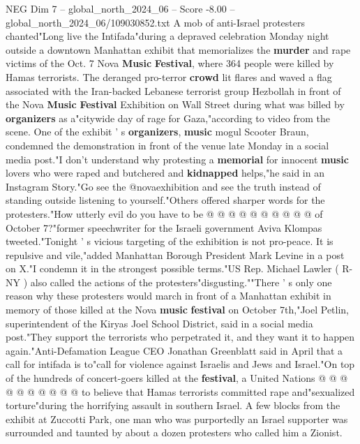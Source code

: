 \begin{textsample}{NEG Dim 7 – global\_north\_2024\_06 – Score -8.00 – global\_north\_2024\_06/109030852.txt}  \label{ex:f7_neg_139}
A mob of anti-Israel protesters chanted"Long live the Intifada"during a depraved celebration Monday night outside a downtown Manhattan exhibit that memorializes the \textbf{murder} and rape victims of the Oct. 7 Nova \textbf{Music} \textbf{Festival}, where 364 people were killed by Hamas terrorists.
The deranged pro-terror \textbf{crowd} lit flares and waved a flag associated with the Iran-backed Lebanese terrorist group Hezbollah in front of the Nova \textbf{Music} \textbf{Festival} Exhibition on Wall Street during what was billed by \textbf{organizers} as a"citywide day of rage for Gaza,"according to video from the scene.
One of the exhibit ' s \textbf{organizers}, \textbf{music} mogul Scooter Braun, condemned the demonstration in front of the venue late Monday in a social media post."I don't understand why protesting a \textbf{memorial} for innocent \textbf{music} lovers who were raped and butchered and \textbf{kidnapped} helps,"he said in an Instagram Story."Go see the @novaexhibition and see the truth instead of standing outside listening to yourself."Others offered sharper words for the protesters."How utterly evil do you have to be @ @ @ @ @ @ @ @ @ @ of October 7?"former speechwriter for the Israeli government Aviva Klompas tweeted."Tonight ' s vicious targeting of the exhibition is not pro-peace.
It is repulsive and vile,"added Manhattan Borough President Mark Levine in a post on X."I condemn it in the strongest possible terms."US Rep.
Michael Lawler ( R-NY ) also called the actions of the protesters"disgusting.""There ' s only one reason why these protesters would march in front of a Manhattan exhibit in memory of those killed at the Nova \textbf{music} \textbf{festival} on October 7th,"Joel Petlin, superintendent of the Kiryas Joel School District, said in a social media post."They support the terrorists who perpetrated it, and they want it to happen again."Anti-Defamation League CEO Jonathan Greenblatt said in April that a call for intifada is to"call for violence against Israelis and Jews and Israel."On top of the hundreds of concert-goers killed at the \textbf{festival}, a United Nations @ @ @ @ @ @ @ @ @ @ to believe that Hamas terrorists committed rape and"sexualized torture"during the horrifying assault in southern Israel.
A few blocks from the exhibit at Zuccotti Park, one man who was purportedly an Israel supporter was surrounded and taunted by about a dozen protesters who called him a Zionist.

\end{textsample}
